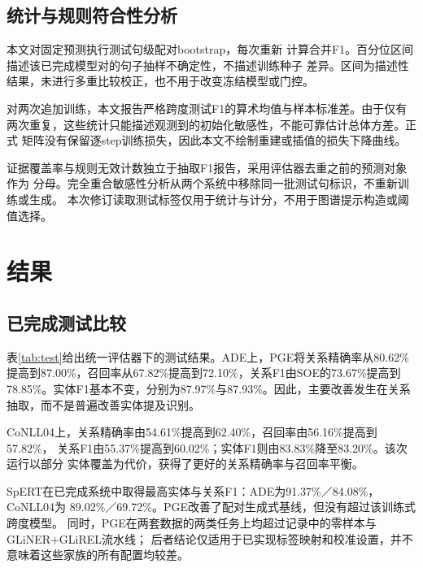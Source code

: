 \documentclass[12pt,a4paper,fontset=none]{ctexart}
\begin{document}
\subsection{统计与规则符合性分析}
本文对固定预测执行测试句级配对bootstrap，每次重新
计算合并F1。百分位区间描述该已完成模型对的句子抽样不确定性，不描述训练种子
差异。区间为描述性结果，未进行多重比较校正，也不用于改变冻结模型或门控。

对两次追加训练，本文报告严格跨度测试F1的算术均值与样本标准差。由于仅有
两次重复，这些统计只能描述观测到的初始化敏感性，不能可靠估计总体方差。正式
矩阵没有保留逐step训练损失，因此本文不绘制重建或插值的损失下降曲线。

证据覆盖率与规则无效计数独立于抽取F1报告，采用评估器去重之前的预测对象作为
分母。完全重合敏感性分析从两个系统中移除同一批测试句标识，不重新训练或生成。
本次修订读取测试标签仅用于统计与计分，不用于图谱提示构造或阈值选择。

\section{结果}
\label{sec:results}
\subsection{已完成测试比较}
表\ref{tab:test}给出统一评估器下的测试结果。ADE上，PGE将关系精确率从80.62\%
提高到87.00\%，召回率从67.82\%提高到72.10\%，关系F1由SOE的73.67\%提高到
78.85\%。实体F1基本不变，分别为87.97\%与87.93\%。因此，主要改善发生在关系
抽取，而不是普遍改善实体提及识别。

CoNLL04上，关系精确率由54.61\%提高到62.40\%，召回率由56.16\%提高到57.82\%，
关系F1由55.37\%提高到60.02\%；实体F1则由83.83\%降至83.20\%。该次运行以部分
实体覆盖为代价，获得了更好的关系精确率与召回率平衡。
\begin{table}[htbp]
\centering\scriptsize\setlength{\tabcolsep}{2.6pt}
\caption{已完成测试比较，严格原文字符跨度微平均分数（\%）。Qwen3-ZS为
Qwen3-4B零样本加已记录验证器；GLiNER+GLiREL仅在训练数据内校准。各数据集使用
自身测试划分，所有行采用同一评估器重算。}
\label{tab:test}

\end{table}

SpERT在已完成系统中取得最高实体与关系F1：ADE为91.37\%／84.08\%，CoNLL04为
89.02\%／69.72\%。PGE改善了配对生成式基线，但没有超过该训练式跨度模型。
同时，PGE在两套数据的两类任务上均超过记录中的零样本与GLiNER+GLiREL流水线；
后者结论仅适用于已实现标签映射和校准设置，并不意味着这些家族的所有配置均较差。
\end{document}
